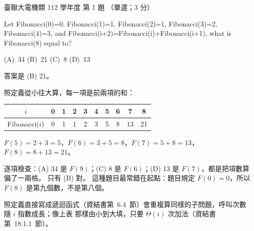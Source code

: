 \begin{pastexam}[label={px:ust-112-ee-ds-01}]{臺聯大電機類 112 學年度 第 1 題}
（單選；3 分）

Let Fibonacci(0)=0, Fibonacci(1)=1, Fibonacci(2)=1, Fibonacci(3)=2, Fibonacci(4)=3, and
Fibonacci(i+2)=Fibonacci(i)+Fibonacci(i+1), what is Fibonacci(8) equal to?

(A)~34 \qquad (B)~21 \qquad (C)~8 \qquad (D)~13
\end{pastexam}

\begin{pastsoln}
答案是 (B) 21。

照定義從小往大算，每一項是前兩項的和：
\begin{center}
\begin{tabular}{*{10}{c}}
\toprule
$i$ & 0 & 1 & 2 & 3 & 4 & 5 & 6 & 7 & 8 \\
\midrule
Fibonacci($i$) & 0 & 1 & 1 & 2 & 3 & 5 & 8 & 13 & 21 \\
\bottomrule
\end{tabular}
\end{center}
$F(5) = 2 + 3 = 5$，$F(6) = 3 + 5 = 8$，$F(7) = 5 + 8 = 13$，$F(8) = 8 + 13 = 21$。

逐項檢查：(A) 34 是 $F(9)$；(C) 8 是 $F(6)$；(D) 13 是 $F(7)$，都是把項數算偏了一兩格。 只有
(B) 對。 這種題目最常錯在起點：題目規定 $F(0) = 0$，所以 $F(8)$ 是第九個數，不是第八個。

照定義直接寫成遞迴函式（資結書第~6.4~節）會重複算同樣的子問題，呼叫次數隨 $i$ 指數成長；像上表
那樣由小到大填，只要 $\Theta(i)$ 次加法（資結書第~18.1.1~節）。
\end{pastsoln}

